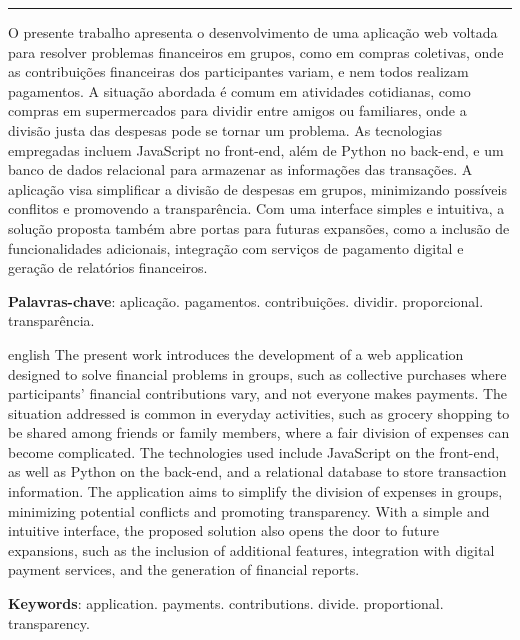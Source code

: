 \maketitle

\noindent\rule{\textwidth}{1pt}

\begin{resumoumacoluna}
    O presente trabalho apresenta o desenvolvimento de uma aplicação web voltada para resolver problemas financeiros em grupos, como em compras coletivas, onde as contribuições financeiras dos participantes variam, e nem todos realizam pagamentos. A situação abordada é comum em atividades cotidianas, como compras em supermercados para dividir entre amigos ou familiares, onde a divisão justa das despesas pode se tornar um problema.
    As tecnologias empregadas incluem JavaScript no front-end, além de Python no back-end, e um banco de dados relacional para armazenar as informações das transações.
    A aplicação visa simplificar a divisão de despesas em grupos, minimizando possíveis conflitos e promovendo a transparência. Com uma interface simples e intuitiva, a solução proposta também abre portas para futuras expansões, como a inclusão de funcionalidades adicionais, integração com serviços de pagamento digital e geração de relatórios financeiros.
   
    \vspace{\onelineskip}
    
    \noindent
    \textbf{Palavras-chave}: aplicação. pagamentos. contribuições. dividir. proporcional. transparência. 
\end{resumoumacoluna}


\renewcommand{\resumoname}{Abstract}
\begin{resumoumacoluna}
\begin{otherlanguage*}{english}
    The present work introduces the development of a web application designed to solve financial problems in groups, such as collective purchases where participants' financial contributions vary, and not everyone makes payments. The situation addressed is common in everyday activities, such as grocery shopping to be shared among friends or family members, where a fair division of expenses can become complicated.
    The technologies used include JavaScript on the front-end, as well as Python on the back-end, and a relational database to store transaction information.
    The application aims to simplify the division of expenses in groups, minimizing potential conflicts and promoting transparency. With a simple and intuitive interface, the proposed solution also opens the door to future expansions, such as the inclusion of additional features, integration with digital payment services, and the generation of financial reports.

    \vspace{\onelineskip}

    \noindent
    \textbf{Keywords}: application. payments. contributions. divide. proportional. transparency. 
\end{otherlanguage*}  
\end{resumoumacoluna}


